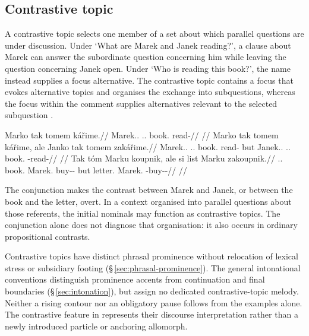 \subsection{Contrastive topic}\label{sec:tc-contrastive-topic}

A contrastive topic selects one member of a set about which parallel questions
 are under discussion. Under `What are Marek and Janek reading?', a clause
 about Marek can answer the subordinate question concerning him while leaving
 the question concerning Janek open. Under `Who is reading this book?', the
 name instead supplies a focus alternative. The contrastive topic contains a focus that evokes alternative
 topics and organises the exchange into subquestions, whereas the focus
 within the comment supplies alternatives relevant to the selected subquestion
 \cite[§§\,5.2, 6.2]{krifka2008}.

\pex\label{ex:tc-ctop}
\a\label{ex:tc-ctop-ordinary}%
\begingl
\gla Marko tak tomem kářime.//
\glb Marek.\Dir{}.\Def{} \Dem{}.\Prox{}.\Dir{} book.\Ind{} read-\Prog{}//
\glft {}
      //
\endgl
\a\label{ex:tc-ctop-contr}%
\begingl
\gla Marko tak tomem kářime, ale Janko tak tomem zakářime.//
\glb Marek.\Dir{}.\Def{} \Dem{}.\Prox{}.\Dir{} book.\Ind{} read-\Prog{} but Janek.\Dir{}.\Def{} \Dem{}.\Prox{}.\Dir{} book.\Ind{} \Neg{}-read-\Prog{}//
\glft {}
      //
\endgl
\a\label{ex:tc-ctop-obj}%
\begingl
\gla Tak tóm Marku koupnik, ale si list Marku zakoupnik.//
\glb \Dem{}.\Prox{}.\Dir{} book.\Dir{} Marek.\Trs{} buy-\Trs{}-\Pf{} but \Sanch{} letter.\Dir{} Marek.\Trs{} \Neg{}-buy-\Trs{}-\Pf{}//
\glft {}
      //
\endgl
\xe

\noindent The conjunction  makes the contrast between Marek and
 Janek, or between the book and the letter, overt. In a context organised into
 parallel questions about those referents, the initial nominals may function
 as contrastive topics. The conjunction alone does not diagnose that
 organisation: it also occurs in ordinary propositional contrasts.

Contrastive topics have distinct phrasal prominence without relocation of
 lexical stress or subsidiary footing (§\,\ref{sec:phrasal-prominence}).
 The general intonational conventions distinguish prominence accents from
 continuation and final boundaries (§\,\ref{sec:intonation}), but assign no
 dedicated contrastive-topic melody. Neither a rising contour nor an obligatory
 pause follows from the examples alone. The contrastive feature in
  represents their discourse interpretation rather than a newly
 introduced particle or anchoring allomorph.

